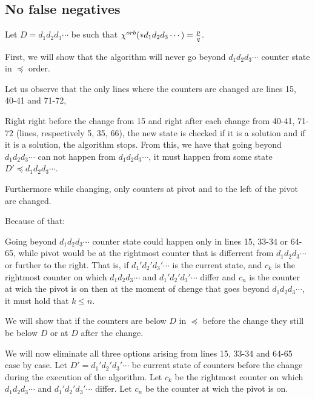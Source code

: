 \subsection{No false negatives}
Let $D = d_1d_2d_3\cdots$ be such that ${\chi^{orb}(*d_1d_2d_3\cdots)} = \frac{p}{q}$. 

%

First, we will show that the algorithm will never 
go beyond $d_1d_2d_3\cdots$ counter state in $\preceq$ order. 

Let us observe that the only lines where 
the counters are changed are lines 15, 40-41 and 71-72, 

Right right before 
the change from 15 and right after each change from 40-41, 71-72 
(lines, respectively 5, 35, 66), 
the new state is checked if it is a solution and 
if it is a solution, the algorithm stops. From this, we 
have that going beyond $d_1d_2d_3\cdots$ can not happen from $d_1d_2d_3\cdots$, 
it must happen from some state $D' \preceq d_1d_2d_3\cdots$.

Furthermore while changing, 
only counters 
at pivot and to the left of the pivot are changed. 

Because of that:
\begin{observation}\label{position of pointer observation}
Going beyond $d_1d_2d_3\cdots$ counter state 
could happen only in lines 15, 33-34 or 64-65, while pivot would be 
at the rightmost counter that is differrent from $d_1d_2d_3\cdots$ or further to the right. 
That is, if $d_1'd_2'd_3'\cdots$ is the current state, and 
$c_k$ is the rightmost counter on which $d_1d_2d_3\cdots$ 
and $d_1'd_2'd_3'\cdots$ differ and $c_n$ is the counter at wich the pivot is on then 
at the moment of chenge that goes beyond $d_1d_2d_3\cdots$, it must hold that $k \leq n$.
\end{observation}

We will show that if the counters are below $D$ in $\preceq$ before the change they still 
be below $D$ or at $D$ after the change. 

We will now eliminate all three options arising from lines 15, 33-34 and 64-65 case by case. 
Let $D' = d_1'd_2'd_3'\cdots$ be current state of counters before the change 
during the execution of the algorithm. 
Let $c_k$ be the rightmost counter on which $d_1d_2d_3\cdots$ 
and $d_1'd_2'd_3'\cdots$ differ. Let $c_n$ be the counter at wich the pivot is on. 

